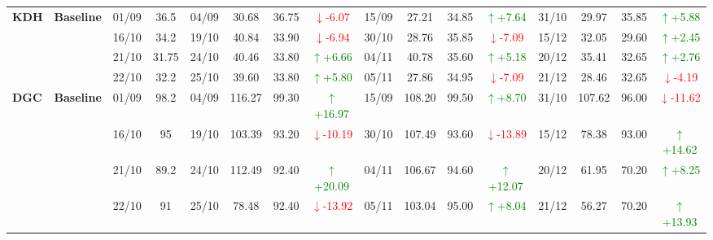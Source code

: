 {\begin{longtable}{llcc|cccc|cccc|cccc}
\multirow{4}{*}{\textbf{KDH}}
& \textbf{Baseline}
& 01/09 & 36.5 & 04/09 & 30.68 & 36.75 & \textcolor{red}{\(\downarrow\)-6.07} & 15/09 & 27.21 & 34.85 & \textcolor{green}{\(\uparrow\)+7.64} & 31/10 & 29.97 & 35.85 & \textcolor{green}{\(\uparrow\)+5.88} \\
& & 16/10 & 34.2 & 19/10 & 40.84 & 33.90 & \textcolor{red}{\(\downarrow\)-6.94} & 30/10 & 28.76 & 35.85 & \textcolor{red}{\(\downarrow\)-7.09} & 15/12 & 32.05 & 29.60 & \textcolor{green}{\(\uparrow\)+2.45} \\
& & 21/10 & 31.75 & 24/10 & 40.46 & 33.80 & \textcolor{green}{\(\uparrow\)+6.66} & 04/11 & 40.78 & 35.60 & \textcolor{green}{\(\uparrow\)+5.18} & 20/12 & 35.41 & 32.65 & \textcolor{green}{\(\uparrow\)+2.76} \\
& & 22/10 & 32.2 & 25/10 & 39.60 & 33.80 & \textcolor{green}{\(\uparrow\)+5.80} & 05/11 & 27.86 & 34.95 & \textcolor{red}{\(\downarrow\)-7.09} & 21/12 & 28.46 & 32.65 & \textcolor{red}{\(\downarrow\)-4.19} \\
\midrule

\multirow{4}{*}{\textbf{DGC}}
& \textbf{Baseline}
& 01/09 & 98.2 & 04/09 & 116.27 & 99.30 & \textcolor{green}{\(\uparrow\)+16.97} & 15/09 & 108.20 & 99.50 & \textcolor{green}{\(\uparrow\)+8.70} & 31/10 & 107.62 & 96.00 & \textcolor{red}{\(\downarrow\)-11.62} \\
& & 16/10 & 95 & 19/10 & 103.39 & 93.20 & \textcolor{red}{\(\downarrow\)-10.19} & 30/10 & 107.49 & 93.60 & \textcolor{red}{\(\downarrow\)-13.89} & 15/12 & 78.38 & 93.00 & \textcolor{green}{\(\uparrow\)+14.62} \\
& & 21/10 & 89.2 & 24/10 & 112.49 & 92.40 & \textcolor{green}{\(\uparrow\)+20.09} & 04/11 & 106.67 & 94.60 & \textcolor{green}{\(\uparrow\)+12.07} & 20/12 & 61.95 & 70.20 & \textcolor{green}{\(\uparrow\)+8.25} \\
& & 22/10 & 91 & 25/10 & 78.48 & 92.40 & \textcolor{red}{\(\downarrow\)-13.92} & 05/11 & 103.04 & 95.00 & \textcolor{green}{\(\uparrow\)+8.04} & 21/12 & 56.27 & 70.20 & \textcolor{green}{\(\uparrow\)+13.93} \\
\midrule


\end{longtable}}

